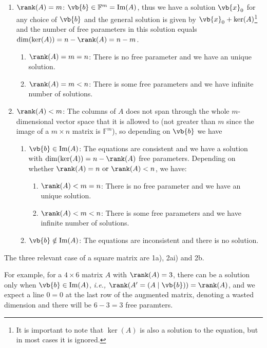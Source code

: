 \documentclass[a4paper,12pt]{report}
\begin{document}
\begin{enumerate}
    \item \(\rank (A) = m\): \(\vb{b} \in \mathbb{F}^{m} = \text{Im} (A)\), thus we have a solution \(\vb{x} _{0} \) for any choice of \(\vb{b} \) and the general solution is given by \(\vb{x} _{0} + \ker (A) \)\footnote{It is important to note that \(\ker (A)\) is also a solution to the equation, but in most cases it is ignored.} and the number of free parameters in this solution equals \(\dim (\ker (A)) = n - \rank (A) = n-m\).   
    \begin{enumerate}
        \item \(\rank (A) = m = n\): There is no free parameter and we have an unique solution.
        \item \(\rank (A) = m < n\): There is some free parameters and we have infinite number of solutions.  
    \end{enumerate}  
    \item \(\rank (A) < m\): The columns of \(A\) does not span through the whole \(m\)-dimensional vector space that it is allowed to (not greater than \(m\) since the image of a \(m \times n\) matrix is \(\mathbb{F}^{m} \)), so depending on \(\vb{b} \) we have \begin{enumerate}
        \item \(\vb{b} \in  \text{Im}(A) \): The equations are consistent and we have a solution with \(\dim (\ker (A)) = n - \rank (A)\) free parameters. Depending on whether \(\rank (A) = n \text { or } \rank (A) < n\), we have: 
        \begin{enumerate}
            \item \(\rank (A) < m = n\): There is no free parameter and we have an unique solution.
            \item \(\rank (A) < m < n\): There is some free parameters and we have infinite number of solutions.  
        \end{enumerate}
        \item \(\vb{b} \notin \text{Im}(A) \): The equations are inconsistent and there is no solution.  
    \end{enumerate}  
\end{enumerate}

The three relevant case of a square matrix are 1a), 2ai) and 2b.

For example, for a \(4 \times 6\) matrix \(A\) with \(\rank (A) = 3\), there can be a solution only when \(\vb{b} \in  \text{Im}(A) \), \textit{i.e.,} \(\rank (A' = (A \mid \vb{b} )) = \rank (A)\), and we expect a line \(0 = 0\) at the last row of the augmented matrix, denoting a wasted dimension and there will be \(6-3=3\) free paramters.     
\end{document}
